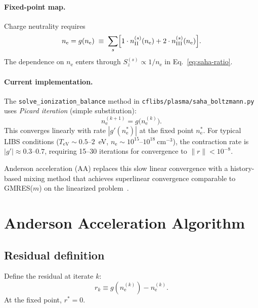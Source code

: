 \documentclass[11pt]{article}
\newcommand{\ne}{n_\mathrm{e}}
\newcommand{\TeV}{T_\mathrm{eV}}
\begin{document}
\paragraph{Fixed-point map.}
Charge neutrality requires
%
\begin{equation}
  \label{eq:charge-neutrality}
  \ne = g(\ne)
  \;\equiv\;
  \sum_s \Bigl[
    1 \cdot n_\mathrm{II}^{(s)}(\ne)
    + 2 \cdot n_\mathrm{III}^{(s)}(\ne)
  \Bigr].
\end{equation}
%
%
The dependence on $\ne$ enters through $S_z^{(s)} \propto 1/\ne$ in
Eq.~\eqref{eq:saha-ratio}.

\paragraph{Current implementation.}
The \texttt{solve\_ionization\_balance} method in
\texttt{cflibs/plasma/saha\_boltzmann.py} uses \emph{Picard iteration}
(simple substitution):
%
\begin{equation}
  \label{eq:picard}
  \ne^{(k+1)} = g\bigl(\ne^{(k)}\bigr).
\end{equation}
%
This converges linearly with rate $|g'(\ne^*)|$ at the fixed point
$\ne^*$.  For typical LIBS conditions ($\TeV \sim 0.5$--$2$~eV,
$\ne \sim 10^{15}$--$10^{18}~\mathrm{cm}^{-3}$), the contraction rate
is $|g'| \approx 0.3$--$0.7$, requiring 15--30 iterations for
convergence to $\|r\| < 10^{-8}$.

Anderson acceleration (AA) replaces this slow linear convergence with a
history-based mixing method that achieves superlinear convergence
comparable to GMRES($m$) on the linearized problem~\cite{walker-ni-2011}.


\section{Anderson Acceleration Algorithm}
\label{sec:anderson}

\subsection{Residual definition}

Define the residual at iterate $k$:
%
\begin{equation}
  \label{eq:residual}
  r_k \equiv g(\ne^{(k)}) - \ne^{(k)}.
\end{equation}
%
At the fixed point, $r^* = 0$.
\end{document}
